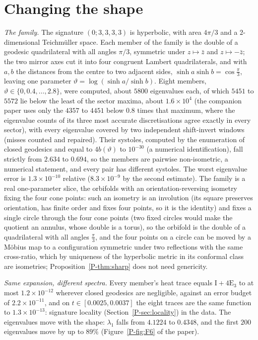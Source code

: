 \documentclass[pdflatex,sn-mathphys-num]{sn-jnl}
\newcommand{\pref}[1]{\ref*{P-#1}}%
\theoremstyle{thmstyleone}%
\theoremstyle{thmstylethree}%
\begin{document}
\section{Changing the shape}\label{sec:moduli}

\emph{The family.} The signature $(0;3,3,3,3)$ is hyperbolic, with area $4\pi/3$ and a $2$-dimensional Teichm\"uller space. Each member of the family is the double of a geodesic quadrilateral with all angles $\pi/3$, symmetric under $z\mapsto\bar z$ and $z\mapsto-\bar z$; the two mirror axes cut it into four congruent Lambert quadrilaterals, and with $a,b$ the distances from the centre to two adjacent sides, $\sinh a\sinh b=\cos\frac\pi3$, leaving one parameter $\vartheta=\log(\sinh a/\sinh b)$. Eight members, $\vartheta\in\{0,0.4,\dots,2.8\}$, were computed, about $5800$ eigenvalues each, of which $5451$ to $5572$ lie below the least of the sector maxima, about $1.6\times10^4$ (the companion paper uses only the $4357$ to $4451$ below $0.8$ times that maximum, where the eigenvalue counts of its three most accurate discretisations agree exactly in every sector), with every eigenvalue covered by two independent shift-invert windows (misses counted and repaired). Their systoles, computed by the enumeration of closed geodesics and equal to $4b(\vartheta)$ to $10^{-30}$ (a numerical identification), fall strictly from $2.634$ to $0.694$, so the members are pairwise non-isometric, a numerical statement, and every pair has different systoles. The worst eigenvalue error is $1.3\times10^{-10}$ relative ($8.3\times10^{-9}$ by the second estimate). The family is a real one-parameter slice, the orbifolds with an orientation-reversing isometry fixing the four cone points: such an isometry is an involution (its square preserves orientation, has finite order and fixes four points, so it is the identity) and fixes a single circle through the four cone points (two fixed circles would make the quotient an annulus, whose double is a torus), so the orbifold is the double of a quadrilateral with all angles $\frac\pi3$, and the four points on a circle can be moved by a M\"obius map to a configuration symmetric under two reflections with the same cross-ratio, which by uniqueness of the hyperbolic metric in its conformal class are isometries; Proposition~\pref{thm:sharp} does not need genericity.

\emph{Same expansion, different spectra.} Every member's heat trace equals $\mathrm I+4\mathrm E_3$ to at most $1.2\times10^{-12}$ wherever closed geodesics are negligible, against an error budget of $2.2\times10^{-11}$, and on $t\in[0.0025,0.0037]$ the eight traces are the same function to $1.3\times10^{-13}$: signature locality (Section~\pref{sec:locality}) in the data. The eigenvalues move with the shape: $\lambda_1$ falls from $4.1224$ to $0.4348$, and the first $200$ eigenvalues move by up to $89\%$ (Figure~\pref{fig:F6} of the paper).
\end{document}
